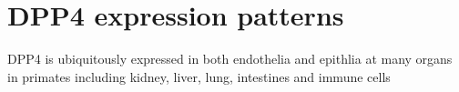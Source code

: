 \section{DPP4 expression patterns}
DPP4 is ubiquitously expressed in both endothelia and epithlia at many organs in primates including kidney, liver, lung, intestines and immune cells